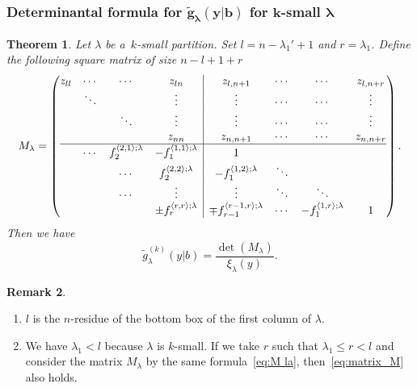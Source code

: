 \documentclass[10pt,a4paper]{amsart}
\numberwithin{equation}{section}
\newcommand{\bl}{\mathbf{l}}
\newcommand{\co}{\xi}
\newcommand{\la}{\lambda}
\newcommand{\ha}{f}
\newtheorem{Theorem}{Theorem}[section]
\theoremstyle{definition}
\newtheorem{Remark}[Theorem]{Remark}
\begin{document}
\subsubsection[Determinantal formula for g\_la(y|b) for k-small la]{Determinantal formula for $\boldsymbol{\tilde{g}_\la(y|b)}$ for $\boldsymbol{k}$-small $\boldsymbol{\la}$}


\begin{Theorem}\label{thm:determinant_formula_for_ksmall_g}
Let $\lambda$ be a~$k$-small partition.
Set $
l=n-\la_1'+1$
and $r=\la_1$.
Define the following
square matrix of size $n-l+1+r$
\begin{equation}\label{eq:M la}
 M_\la=
 \left(
\begin{array}{@{}cccc|cccc@{}}
 z_{ll}&\cdots &\cdots &z_{ln}&z_{l,n+1}&\cdots&\cdots&z_{l,n+r}\\
 &\ddots& &\vdots&\vdots&\cdots&\cdots&\vdots\\
 &&\ddots &\vdots&\vdots&\cdots&\cdots&\vdots\\
 & &&z_{nn}&z_{n,n+1}&\cdots&\cdots&z_{n,n+r}\\ \hline
 &\cdots
 & \ha_2^{\langle {2,1}\rangle;\la} & -\ha_1^{\langle 1,1\rangle;\la} & 1 & & \\
 &&\cdots
 &\ha_2^{\langle 2,2\rangle;\la}&-\ha_1^{\langle 1,2\rangle;\la} & \ddots &&\\
 &&\cdots&\vdots&\vdots & \ddots &\ddots&\\
 &&&\pm \ha_r^{\langle r,r\rangle;\la}&\mp \ha_{r-1}^{\langle r-1,r\rangle;\la}&\cdots &-\ha_1^{\langle 1,r\rangle;\la} &1
\end{array}
\right).
\end{equation}
Then we have
\begin{equation}\label{eq:matrix_M}
\tilde{g}^{(k)}_{\lambda}(y|b)=
\frac{\det(M_\lambda)}{\co_\la(y)}.
\end{equation}
\end{Theorem}


\begin{Remark}\quad
\begin{enumerate}
\itemsep=0pt
\item[(1)] $l$ is the $n$-residue of the bottom box of the first column of $\la$.
 \item[(2)] We have $\la_1<l$ because $\la$ is $k$-small.
If we take $r$ such that $\la_1\le r<l$ and
 consider the matrix $M_\la$ by the same formula~\eqref{eq:M la},
 then~\eqref{eq:matrix_M} also holds.
\end{enumerate}

\end{Remark}
\end{document}
